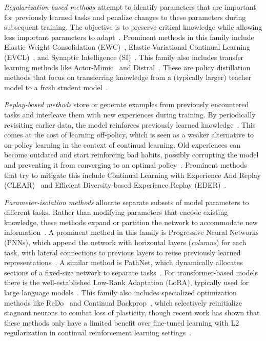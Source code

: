 \textit{Regularization-based methods} attempt to identify parameters that are important for previously learned tasks and penalize changes to these parameters during subsequent training.
The objective is to preserve critical knowledge while allowing less important parameters to adapt~\cite{khetarpal2022crl,wang2024cl}.
Prominent methods in this family include Elastic Weight Consolidation (EWC)~\cite{kirkpatrick2017ewc}, Elastic Variational Continual Learning (EVCL)~\cite{batra2024evcl}, and Synaptic Intelligence (SI)~\cite{zenke2017si}.
This family also includes transfer learning methods like Actor-Mimic~\cite{parisotto2015actormimic} and Distral~\cite{teh2017distral}.
These are policy distillation methods that focus on transferring knowledge from a (typically larger) teacher model to a fresh student model~\cite{khetarpal2022crl,zhu2023tl}.

\textit{Replay-based methods} store or generate examples from previously encountered tasks and interleave them with new experiences during training.
By periodically revisiting earlier data, the model reinforces previously learned knowledge~\cite{khetarpal2022crl,wang2024cl}.
This comes at the cost of learning off-policy, which is seen as a weaker alternative to on-policy learning in the context of continual learning.
Old experiences can become outdated and start reinforcing bad habits, possibly corrupting the model and preventing it from converging to an optimal policy~\cite{wang2024cl,hasselt2018deadlytriad}.
Prominent methods that try to mitigate this include Continual Learning with Experience And Replay (CLEAR)~\cite{rolnick2019clear} and Efficient Diversity-based Experience Replay (EDER)~\cite{zhao2024eder}.

\textit{Parameter-isolation methods} allocate separate subsets of model parameters to different tasks.
Rather than modifying parameters that encode existing knowledge, these methods expand or partition the network to accommodate new information~\cite{khetarpal2022crl,wang2024cl,zhu2023tl}.
A prominent method in this family is Progressive Neural Networks (PNNs), which append the network with horizontal layers (\textit{columns}) for each task, with lateral connections to previous layers to reuse previously learned representations~\cite{zhu2023tl,rusu2016pnn}.
A similar method is PathNet, which dynamically allocates sections of a fixed-size network to separate tasks~\cite{zhu2023tl,fernando2017pathnet}.
For transformer-based models there is the well-established Low-Rank Adaptation (LoRA), typically used for large language models~\cite{hu2022lora}.
This family also includes specialized optimization methods like ReDo~\cite{sokar2023redo} and Continual Backprop~\cite{dohare2021cbp}, which selectively reinitialize stagnant neurons to combat loss of plasticity, though recent work has shown that these methods only have a limited benefit over fine-tuned learning with L2 regularization in continual reinforcement learning settings~\cite{dohare2024plasticity,lyle2023plasticity}.

